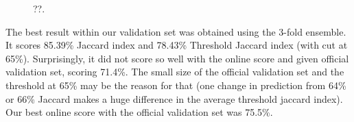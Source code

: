 \documentclass[conference]{IEEEtran}
\begin{document}
\begin{figure}
\centering
{}\hfil
{}
\caption{??.}\label{result_samples}
\end{figure}

The best result within our validation set was obtained using the 3-fold ensemble.  It scores 85.39\% Jaccard index and 78.43\% Threshold Jaccard index (with cut at 65\%). Surprisingly, it did not score so well with the online score and given official validation set, scoring 71.4\%.  The small size of the official validation set and the threshold at 65\% may be the reason for that (one change in prediction from 64\% or 66\% Jaccard makes a huge difference in the average threshold jaccard index). Our best online score with the official validation set was 75.5\%. 
\end{document}
